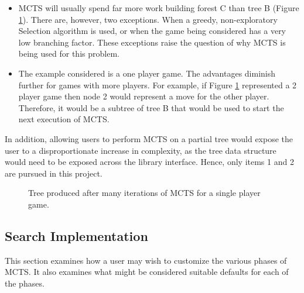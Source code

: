 \begin{itemize}
\item[] {MCTS} will usually spend far more work building forest C than tree B (Figure \ref{fig:subtreewaste}). There are, however, two exceptions. When a greedy, non-exploratory Selection algorithm is used, or when the game being considered has a very low branching factor. These exceptions raise the question of why {MCTS} is being used for this problem.
\item[] The example considered is a one player game. The advantages diminish further for games with more players. For example, if Figure \ref{fig:subtreewaste} represented a 2 player game then node 2 would represent a move for the other player. Therefore, it would be a subtree of tree B that would be used to start the next execution of {MCTS}.
\end{itemize}
In addition, allowing users to perform MCTS on a partial tree would expose the user to a disproportionate increase in complexity, as the tree data structure would need to be exposed across the library interface. Hence, only items 1 and 2 are pursued in this project. 

\begin{figure}[]
\centering
\scalebox{0.7}{}

\caption{\label{fig:subtreewaste}Tree produced after many iterations of {MCTS} for a single player game.}
\end{figure}

\subsection{Search Implementation}
This section examines how a user may wish to customize the various phases of {MCTS}. It also examines what might be considered suitable defaults for each of the phases.
